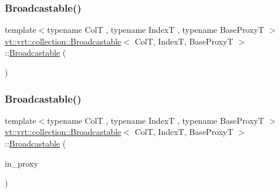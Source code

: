 \mbox{\label{structvt_1_1vrt_1_1collection_1_1_broadcastable_ae2095333f93c2448ee62b0dd7edcebd0}} 
\subsubsection{\texorpdfstring{Broadcastable()}{Broadcastable()}\hspace{0.1cm}{\footnotesize\ttfamily [3/4]}}
{\footnotesize\ttfamily template$<$typename ColT , typename IndexT , typename Base\+ProxyT $>$ \\
\hyperlink{structvt_1_1vrt_1_1collection_1_1_broadcastable}{vt\+::vrt\+::collection\+::\+Broadcastable}$<$ ColT, IndexT, Base\+ProxyT $>$\+::\hyperlink{structvt_1_1vrt_1_1collection_1_1_broadcastable}{Broadcastable} (\begin{DoxyParamCaption}\item[{\hyperlink{structvt_1_1vrt_1_1collection_1_1_broadcastable}{Broadcastable}$<$ ColT, IndexT, Base\+ProxyT $>$ \&\&}]{ }\end{DoxyParamCaption})\hspace{0.3cm}{\ttfamily [default]}}

\mbox{\label{structvt_1_1vrt_1_1collection_1_1_broadcastable_a62e91c5dfe22893acb08c01289de3941}} 
\subsubsection{\texorpdfstring{Broadcastable()}{Broadcastable()}\hspace{0.1cm}{\footnotesize\ttfamily [4/4]}}
{\footnotesize\ttfamily template$<$typename ColT , typename IndexT , typename Base\+ProxyT $>$ \\
\hyperlink{structvt_1_1vrt_1_1collection_1_1_broadcastable}{vt\+::vrt\+::collection\+::\+Broadcastable}$<$ ColT, IndexT, Base\+ProxyT $>$\+::\hyperlink{structvt_1_1vrt_1_1collection_1_1_broadcastable}{Broadcastable} (\begin{DoxyParamCaption}\item[{\hyperlink{namespacevt_a1b417dd5d684f045bb58a0ede70045ac}{Virtual\+Proxy\+Type} const}]{in\+\_\+proxy }\end{DoxyParamCaption})}



